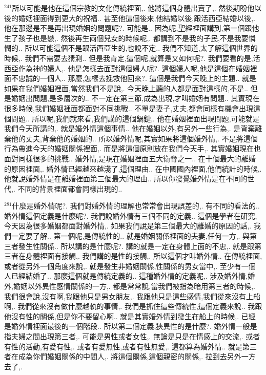 \documentclass{book}
\begin{document}
$^{241}$所以可能是他在這個宗教的文化傳統裡面,.
他將這個身體出賣了,.
然後期盼他以後的婚姻裡面得到更大的祝福..
甚至他這個後來,他結婚以後,跟活西亞結婚以後,.
他在那邊是不是再出現婚姻的問題呢?.
可能是..
因為呢,聖經裡面講到,第一個跟他生了孩子也是戀,.
然後再生兩個兒女的時候呢,.
都講到不是我的子民,不是我要憐憫的..
所以可能這個不是跟活西亞生的,也說不定..
我們不知道,太了解這個世界的時候,.
我們不需要去猜測..
但是我肯定,這個呢,就算是又如何呢?.
我們要看的是,活西亞作為神的婦人,.
他是怎樣去面對這個婦人呢?.
這個婦人呢,他是這個在婚姻裡面不忠誠的一個人..
那麼,怎樣去挽救他回來?.
這個是我們今天晚上的主題..
就是如果在我們婚姻裡面,當然我們不是說,.
今天晚上聽的人都是面對這樣的,不是..
但是婚姻出問題,是多層次的..
不一定在第三節,成為出現,才叫婚姻有問題..
其實現在很多時候,我們婚姻裡面都面對不同挑戰..
不單是妻子,丈夫,都會同樣有機會出現這個問題..
所以呢,我們就來看,我們講的這個鍋鏈,.
他在婚姻裡面出現問題,可能就是我們今天所講的,.
就是婚外情這個事情..
他在婚姻以外,有另外一些行為,.
是背棄離棄他的丈夫,背棄他的婚姻的..
所以婚外情呢,其實如果將這個婚外情,.
不是將這個行為帶進今天的婚姻關係裡面,.
而是將這個原則放在我們今天手,.
其實婚姻現在也面對同樣很多的挑戰..
婚外情,是現在婚姻裡面五大衛脅之一..
在十個最大的離婚的原因裡面,.
婚外情已經越來越淺了,這個理由..
在中國國內裡面,他們統計的時候,.
他就說婚外情是在離婚裡面第三個最大的理由..
所以你發覺婚外情是在不同的世代,.
不同的背景裡面都會同樣出現的..

$^{281}$什麼是婚外情呢?.
我們對婚外情的理解也常常會出現誤差的,.
有不同的看法的..
婚外情這個定義是什麼呢?.
我們說婚外情有三個不同的定義..
這個是學者在研究,今天因為很多婚姻都面對婚外情,.
如果我們說是第三個最大的離婚的原因的話,.
我們一定要了解..
第一個呢,是傳統性的..
就是婚姻關係裡面的夫妻,任何一方,.
與第三者發生性關係..
所以講的是什麼呢?.
講的就是一定在身體上面的不忠,.
就是跟第三者在身體裡面有接觸,.
我們講的是性的接觸,.
所以這個才叫婚外情..
在傳統裡面,或者從另外一個角度來說,.
就是發生非婚姻關係,性關係的男女當中,.
至少有一個人已經結婚了..
那麼這個就是傳統定義的..
這種婚外情的定義呢,.
涉及婚外情,婚外,婚姻以外異性感情關係的一方,.
都是常常說,當我們被指為暗用第三者的時候,.
我們很會說,沒有啊,我跟他只是男女朋友,.
我跟他只是這些感情,我們從來沒有上船啊,.
我們從來沒有做什麼越軌的事情,.
我們是抓住這些傳統性,這個定義來說..
我跟他沒有性的關係,但是你不要留心啊..
就是其實婚外情到發生在船上的時候,.
已經是婚外情裡面最後的一個階段..
所以第二個定義,狹異性的是什麼?.
婚外情一般是指夫婦之間出現第三者,.
可能是男性或者女性,.
無論是只是在情感上的交流,.
或者有性的活動,有愛有性,.
或者有愛無性,或者有性無愛,.
這都算為婚外情..
就是第三者在成為你們婚姻關係的中間人,.
將這個關係,這個親密的關係,.
拉到去另外一方去了,.
\end{document}

